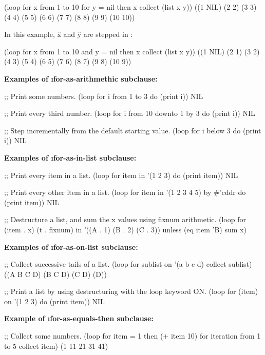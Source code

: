 \code
 (loop for x from 1 to 10 
       for y = nil then x 
       collect (list x y))
\EV ((1 NIL) (2 2) (3 3) (4 4) (5 5) (6 6) (7 7) (8 8) (9 9) (10 10))
\endcode
 
In this example, \f{x} and \f{y} are stepped in :
 
\code
 (loop for x from 1 to 10 
       and y = nil then x 
       collect (list x y))
\EV ((1 NIL) (2 1) (3 2) (4 3) (5 4) (6 5) (7 6) (8 7) (9 8) (10 9))
\endcode
 
\goodbreak
{\bf Examples of \i{for-as-arithmethic} subclause:}

\code
;; Print some numbers.
 (loop for i from 1 to 3
       do (print i))
\EV NIL
 
;; Print every third number.
 (loop for i from 10 downto 1 by 3
       do (print i))
\EV NIL
 
;; Step incrementally from the default starting value.
 (loop for i below 3
       do (print i))
\EV NIL
\endcode
 
{\bf Examples of \i{for-as-in-list} subclause:}

\code
;; Print every item in a list.
 (loop for item in '(1 2 3) do (print item))
\EV NIL
 
;; Print every other item in a list.
 (loop for item in '(1 2 3 4 5) by #'cddr
       do (print item))
\EV NIL
 
;; Destructure a list, and sum the x values using fixnum arithmetic.
 (loop for (item . x) (t . fixnum) in '((A . 1) (B . 2) (C . 3))
       unless (eq item 'B) sum x)
\endcode
 
{\bf Examples of \i{for-as-on-list} subclause:}

\code
;; Collect successive tails of a list.
 (loop for sublist on '(a b c d)
       collect sublist)
\EV ((A B C D) (B C D) (C D) (D))
 
;; Print a list by using destructuring with the loop keyword ON.
 (loop for (item) on '(1 2 3)
       do (print item))
\EV NIL
 
\endcode

{\bf Example of \i{for-as-equals-then} subclause:}

% 
\code
;; Collect some numbers.
 (loop for item = 1 then (+ item 10)
       for iteration from 1 to 5
       collect item)
\EV (1 11 21 31 41)
\endcode
 
